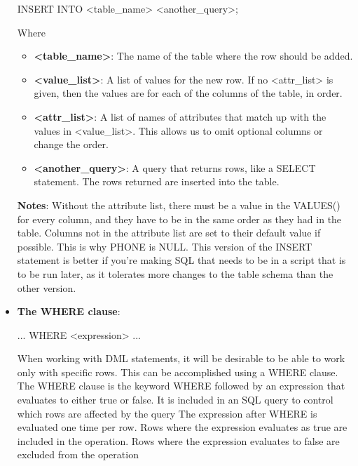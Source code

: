 \documentclass{report}
\begin{document}
\begin{itemize}
\begin{sqlcode}
                INSERT INTO <table_name>
                    <another_query>;
            \end{sqlcode}
            \bigbreak \noindent 
            Where 
            \begin{itemize}
                    \item \textbf{<table\_name>}: The name of the table where the row should be added.
                    \item \textbf{<value\_list>}: A list of values for the new row. If no <attr\_list> is given, then the values are for each of the columns of the table, in order.
                    \item \textbf{<attr\_list>}: A list of names of attributes that match up with the values in <value\_list>. This allows us to omit optional columns or change the order.
                    \item \textbf{<another\_query>}: A query that returns rows, like a SELECT statement. The rows returned are inserted into the table.
            \end{itemize}
            \bigbreak \noindent 
            \textbf{Notes}: Without the attribute list, there must be a value in the VALUES() for every column, and they have to be in the same order as they had in the table.
            \bigbreak \noindent 
            Columns not in the attribute list are set to their default value if possible. This is why PHONE is NULL. This version of the INSERT statement is better if you're making SQL that needs to be in a script that is to be run later, as it tolerates more changes to the table schema than the other version.
        \item \textbf{The WHERE clause}:
            \bigbreak \noindent 
            \begin{sqlcode}
            ... WHERE <expression> ...
            \end{sqlcode}
            \bigbreak \noindent 
            When working with DML statements, it will be desirable to be able to work only with specific rows. This can be accomplished using a WHERE clause.
            \bigbreak \noindent 
            The WHERE clause is the keyword WHERE followed by an expression that evaluates to either true or false. It is included in an SQL query to control which rows are affected by the query
            \bigbreak \noindent 
            The expression after WHERE is evaluated one time per row. Rows where the expression evaluates as true are included in the operation. Rows where the expression evaluates to false are excluded from the operation

\end{itemize}
\end{document}
